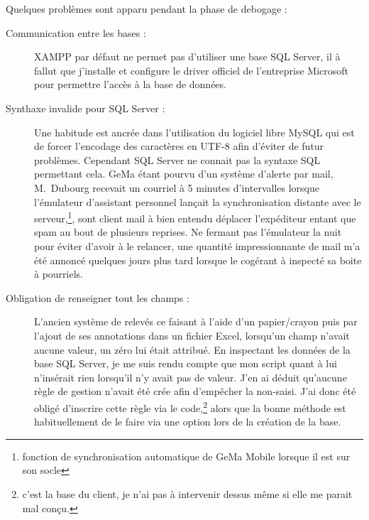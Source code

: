 Quelques problèmes sont apparu pendant la phase de debogage :
\begin{description}

  \item[Communication entre les bases :] XAMPP par défaut ne permet pas
    d'utiliser une base SQL Server, il à fallut que j'installe et
    configure le driver officiel de l'entreprise
    Microsoft pour permettre l'accès à la base de
    données.

  \item[Synthaxe invalide pour SQL Server :] Une habitude est ancrée
    dans l'utilisation du logiciel libre MySQL qui est de forcer
    l'encodage des caractères en UTF-8 afin d'éviter de futur problèmes.
    Cependant SQL Server ne connait pas la syntaxe SQL permettant cela.
    GeMa étant pourvu d'un système d'alerte par mail, M.~Dubourg
    recevait un courriel à 5 minutes d'intervalles lorsque l'émulateur
    d'assistant personnel lançait la synchronisation distante avec le
    serveur,\footnote{fonction de synchronisation automatique de GeMa
    Mobile lorsque il est sur son socle}, sont client mail à bien
    entendu déplacer l'expéditeur entant que spam au bout de plusieurs
    reprises. Ne fermant pas l'émulateur la nuit pour éviter d'avoir à
    le relancer, une quantité impressionnante de mail m'a été annoncé
    quelques jours plus tard lorsque le cogérant à inspecté sa boite à
    pourriels.

  \item[Obligation de renseigner tout les champs :] L'ancien système de
    relevés ce faisant à l'aide d'un papier/crayon puis par l'ajout de
    ses annotations dans un fichier Excel, lorsqu'un champ n'avait
    aucune valeur, un zéro lui était attribué. En inspectant les données
    de la base SQL Server, je me suis rendu compte que mon script quant
    à lui n'insérait rien lorsqu'il n'y avait pas de valeur. J'en ai
    déduit qu'aucune règle de gestion n'avait été crée afin d'empêcher
    la non-saisi. J'ai donc été obligé d'inscrire cette règle via le
    code,\footnote{c'est la base du client, je n'ai pas à intervenir
    dessus même si elle me parait mal conçu.} alors que la bonne méthode
    est habituellement de le faire via une option lors de la création de
    la base.

\end{description}
